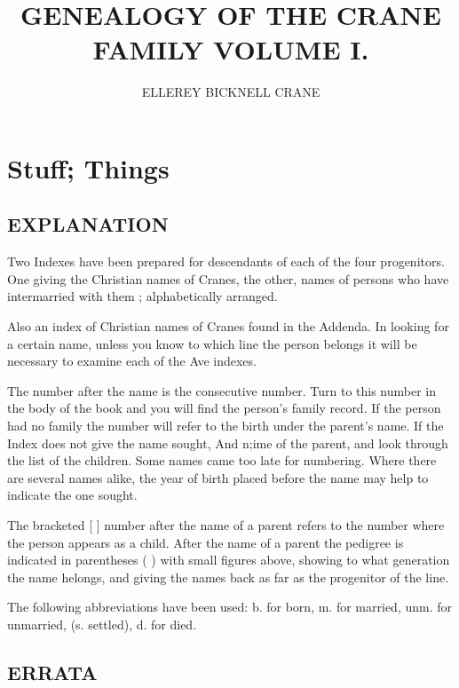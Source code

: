 \documentclass{book}
\begin{document}
\title{GENEALOGY OF THE CRANE FAMILY VOLUME I.}
\author{ELLEREY BICKNELL CRANE}

\maketitle
\tableofcontents

\chapter{Stuff; Things}

\section{EXPLANATION}

Two Indexes have been prepared for descendants of each of the
four progenitors. One giving the Christian names of Cranes, the other,
names of persons who have intermarried with them ; alphabetically
arranged.

Also an index of Christian names of Cranes found in the Addenda.
In looking for a certain name, unless you know to which line the
person belongs it will be necessary to examine each of the Ave indexes.

The number after the name is the consecutive number. Turn to this
number in the body of the book and you will find the person's family
record. If the person had no family the number will refer to the birth
under the parent's name. If the Index does not give the name sought,
And n;ime of the parent, and look through the list of the children.
Some names came too late for numbering. Where there are several
names alike, the year of birth placed before the name may help to
indicate the one sought.

The bracketed [  ] number after the name of a parent refers to the number where the person appears as a child.
After the name of a  parent the pedigree is indicated in parentheses ( ) with small figures above, showing to what
generation the name helongs, and giving the names back as far as the progenitor of the line.

The following abbreviations have been used: b. for born, m. for
married, unm. for unmarried, (s. settled), d. for died.



\section{ERRATA}
\end{document}
